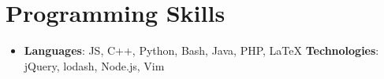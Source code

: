\documentclass[letterpaper,11pt]{article}
\newcommand{\resumeSubHeadingListStart}{\begin{itemize}[leftmargin=*]}
\newcommand{\resumeSubHeadingListEnd}{\end{itemize}}
\begin{document}
\section{Programming Skills}
  \resumeSubHeadingListStart
    \item{
        \textbf{Languages}{: JS, C++, Python, Bash, Java, PHP, LaTeX}
      \hfill
      \textbf{Technologies}{: jQuery, lodash, Node.js, Vim}
    }
  \resumeSubHeadingListEnd


\end{document}
